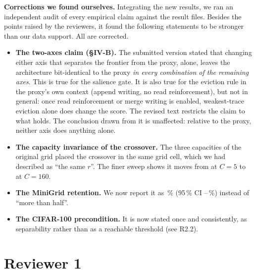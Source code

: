 \documentclass[11pt]{article}
\begin{document}
\textbf{Corrections we found ourselves.} Integrating the new results, we ran an
independent audit of every empirical claim against the result files. Besides
the points raised by the reviewers, it found the following statements to be
stronger than our data support. All are corrected.
\begin{itemize}
\item \textbf{The two-axes claim (§IV-B).} The submitted version stated that
changing either axis that separates the frontier from the proxy, alone, leaves
the architecture bit-identical to the proxy \emph{in every combination of the
remaining axes}. This is true for the salience gate. It is also true for the
eviction rule in the proxy's own context (append writing, no read
reinforcement), but not in general: once read reinforcement or merge writing
is enabled, weakest-trace eviction alone does change the score. The revised
text restricts the claim to what holds. The conclusion drawn from it is
unaffected: relative to the proxy, neither axis does anything alone.
\item \textbf{The capacity invariance of the crossover.} The three capacities
of the original grid placed the crossover in the same grid cell, which we had
described as ``the same $r$''. The finer sweep shows it moves from
 at
$C=5$ to 
at $C=160$.
\item \textbf{The MiniGrid retention.} We now report it as
\,\%
(95\,\% CI
--\,\%)
instead of ``more than half''.
\item \textbf{The CIFAR-100 precondition.} It is now stated once and
consistently, as separability rather than as a reachable threshold (see R2.2).
\end{itemize}

\section*{Reviewer 1}
\end{document}
